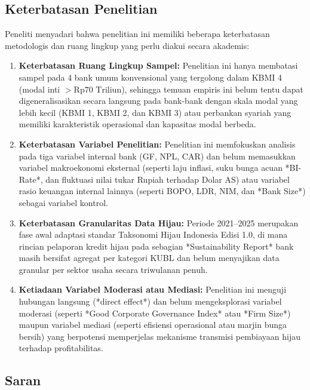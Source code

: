 \documentclass[12pt,a4paper]{article}
\numberwithin{equation}{section}
\begin{document}
\subsection{Keterbatasan Penelitian}

\noindent
Peneliti menyadari bahwa penelitian ini memiliki beberapa keterbatasan metodologis dan ruang lingkup yang perlu diakui secara akademis:
\begin{enumerate}
  \item \textbf{Keterbatasan Ruang Lingkup Sampel:} Penelitian ini hanya membatasi sampel pada 4 bank umum konvensional yang tergolong dalam KBMI 4 (modal inti $> \text{Rp}70 \text{ Triliun}$), sehingga temuan empiris ini belum tentu dapat digeneralisasikan secara langsung pada bank-bank dengan skala modal yang lebih kecil (KBMI 1, KBMI 2, dan KBMI 3) atau perbankan syariah yang memiliki karakteristik operasional dan kapasitas modal berbeda.
  \item \textbf{Keterbatasan Variabel Penelitian:} Penelitian ini memfokuskan analisis pada tiga variabel internal bank (GF, NPL, CAR) dan belum memasukkan variabel makroekonomi eksternal (seperti laju inflasi, suku bunga acuan *BI-Rate*, dan fluktuasi nilai tukar Rupiah terhadap Dolar AS) atau variabel rasio keuangan internal lainnya (seperti BOPO, LDR, NIM, dan *Bank Size*) sebagai variabel kontrol.
  \item \textbf{Keterbatasan Granularitas Data Hijau:} Periode 2021--2025 merupakan fase awal adaptasi standar Taksonomi Hijau Indonesia Edisi 1.0, di mana rincian pelaporan kredit hijau pada sebagian *Sustainability Report* bank masih bersifat agregat per kategori KUBL dan belum menyajikan data granular per sektor usaha secara triwulanan penuh.
  \item \textbf{Ketiadaan Variabel Moderasi atau Mediasi:} Penelitian ini menguji hubungan langsung (*direct effect*) dan belum mengeksplorasi variabel moderasi (seperti *Good Corporate Governance Index* atau *Firm Size*) maupun variabel mediasi (seperti efisiensi operasional atau marjin bunga bersih) yang berpotensi memperjelas mekanisme transmisi pembiayaan hijau terhadap profitabilitas.
\end{enumerate}

\subsection{Saran}
\end{document}
